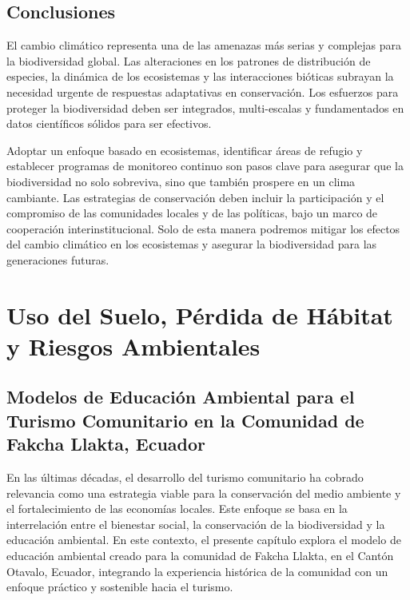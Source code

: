 \documentclass[
  letterpaper,
  DIV=11,
  numbers=noendperiod,
  oneside]{scrreprt}
\begin{document}
\section{Conclusiones}\label{conclusiones}

El cambio climático representa una de las amenazas más serias y
complejas para la biodiversidad global. Las alteraciones en los patrones
de distribución de especies, la dinámica de los ecosistemas y las
interacciones bióticas subrayan la necesidad urgente de respuestas
adaptativas en conservación. Los esfuerzos para proteger la
biodiversidad deben ser integrados, multi-escalas y fundamentados en
datos científicos sólidos para ser efectivos.

Adoptar un enfoque basado en ecosistemas, identificar áreas de refugio y
establecer programas de monitoreo continuo son pasos clave para asegurar
que la biodiversidad no solo sobreviva, sino que también prospere en un
clima cambiante. Las estrategias de conservación deben incluir la
participación y el compromiso de las comunidades locales y de las
políticas, bajo un marco de cooperación interinstitucional. Solo de esta
manera podremos mitigar los efectos del cambio climático en los
ecosistemas y asegurar la biodiversidad para las generaciones futuras.

\chapter{Uso del Suelo, Pérdida de Hábitat y Riesgos
Ambientales}\label{uso-del-suelo-puxe9rdida-de-huxe1bitat-y-riesgos-ambientales}

\section{Modelos de Educación Ambiental para el Turismo Comunitario en
la Comunidad de Fakcha Llakta,
Ecuador}\label{modelos-de-educaciuxf3n-ambiental-para-el-turismo-comunitario-en-la-comunidad-de-fakcha-llakta-ecuador}

En las últimas décadas, el desarrollo del turismo comunitario ha cobrado
relevancia como una estrategia viable para la conservación del medio
ambiente y el fortalecimiento de las economías locales. Este enfoque se
basa en la interrelación entre el bienestar social, la conservación de
la biodiversidad y la educación ambiental. En este contexto, el presente
capítulo explora el modelo de educación ambiental creado para la
comunidad de Fakcha Llakta, en el Cantón Otavalo, Ecuador, integrando la
experiencia histórica de la comunidad con un enfoque práctico y
sostenible hacia el turismo.
\end{document}
